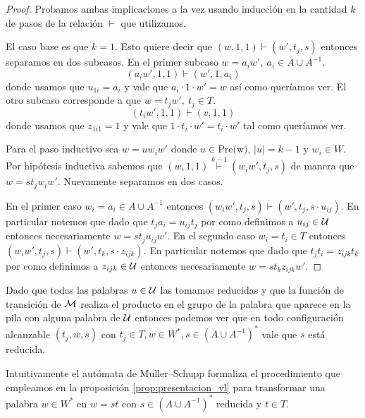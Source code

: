 \documentclass[tesis.tex]{subfiles}
\begin{document}
	\begin{proof}
		Probamos ambas implicaciones a la vez usando inducción en la cantidad $k$ de pasos de la relación $\vdash$ que utilizamos.

		El caso base es que $k = 1$.
		Esto quiere decir que $(w,1, 1) \overset{}{\vdash} (w', t_{j}, s)$
		entonces separamos en dos subcasos. 
		En el primer subcaso $w = a_{i}w', \ a_{i} \in A \cup A^{-1}$.
		\[
		(a_{i}w', 1, 1 ) \vdash (w',1,a_{i})
		\]
		donde usamos que $u_{1i} = a_{i}$ y vale que  $a_{i} \cdot 1 \cdot w' = w$ así como queríamos ver.
		El otro subcaso corresponde a que $w = t_{j}w', \  t_{j} \in T$.
		\[
		(t_{i}w', 1, 1) \vdash (v, 1,1)
		\]
		donde usamos que $z_{1i1} = 1$ y vale que $1 \cdot t_{i} \cdot w' = t_{i} \cdot w'$ tal como queríamos ver.
		
		Para el paso inductivo sea $w = uw_{i}w'$ donde $u \in \text{Pre(w)}$, $|u| = k-1$ y $w_{i} \in W$.
		Por hipótesis inductiva sabemos que 
		$(w,1,1) \overset{k-1}{\vdash} (w_{i}w',t_{j},s)$ de manera que $w = st_{j}w_{i}w'$.
		Nuevamente separamos en dos casos.


		En el primer caso $w_{i} = a_{i} \in A \cup A^{-1}$ entonces 
		$(w_{i}w', t_{j},s) \vdash (w',t_{j} , s \cdot u_{ij})$. 
		En particular notemos que dado que $t_{j}a_{i} = u_{ij}t_{j}$ por como definimos a $u_{ij} \in \cal U$ entonces necesariamente $w = st_{j}u_{ij}w'$.
		En el segundo caso $w_{i} = t_{i} \in T$ entonces 
		$(w_{i}w', t_{j},s) \vdash (w',t_{k} , s \cdot z_{ijk})$.
		En particular notemos que dado que $t_{j}t_{i} = z_{ijk}t_{k}$ por como definimos a $z_{ijk} \in \cal U$ entonces necesariamente $w = st_{k}z_{ijk}w'$.
	\end{proof}

	\begin{obs}
		\label{obs:conf_pal_reducida}
		Dado que todas las palabras $u \in \cal U$ las tomamos reducidas y que la función de transición de $\cal M$ realiza el producto en el grupo de la palabra que aparece en la pila con alguna palabra de $\cal U$ entonces podemos ver que en todo configuración alcanzable $(t_{j},w,s)$ con $t_{j} \in T, w \in W^{*}, s \in (A \cup A^{-1})^{*}$ vale que $s$ está reducida.
	\end{obs}

	Intuitivamente el autómata de Muller--Schupp formaliza el procedimiento que empleamos en la proposición \ref{prop:presentacion_vl} para transformar una palabra $w \in W^*$ en $w = st$ con $s \in (A \cup A^{-1})^{*}$ reducida y $t \in T$.
	
\end{document}
